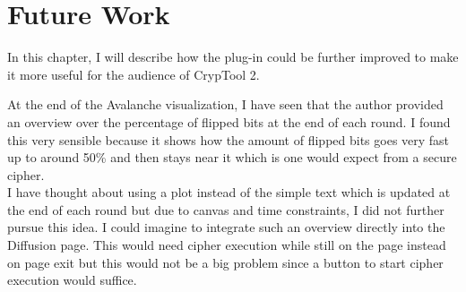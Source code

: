 
\chapter{Future Work}
\label{chap:futureWork}

In this chapter, I will describe how the plug-in could be further improved to make it more useful for the audience of CrypTool 2.

\begin{description}[style=nextline]

\item[Diffusion: Better overview over flipped bits at the end of each round]

At the end of the Avalanche visualization, I have seen that the author provided an overview over the percentage of flipped bits at the end of each round. I found this very sensible because it shows how the amount of flipped bits goes very fast up to around 50\% and then stays near it which is one would expect from a secure cipher. \\
I have thought about using a plot instead of the simple text which is updated at the end of each round but due to canvas and time constraints, I did not further pursue this idea. I could imagine to integrate such an overview directly into the Diffusion page. This would need cipher execution while still on the page instead on page exit but this would not be a big problem since a button to start cipher execution would suffice.

\item[Improve performance during diffusion]


\end{description}
